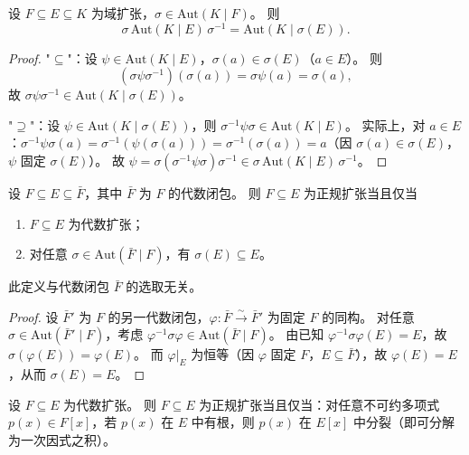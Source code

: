 \documentclass[lang=cn,a4paper,newtx]{elegantbook}
\begin{document}
\begin{proposition}
  设 $F\subseteq E\subseteq K$ 为域扩张，$\sigma\in\mathrm{Aut}(K\mid F)$。
  则
  \[
    \sigma\,\mathrm{Aut}(K\mid E)\,\sigma^{-1}=\mathrm{Aut}(K\mid\sigma(E)).
  \]
\end{proposition}

\begin{proof}
  "$\subseteq$"：设 $\psi\in\mathrm{Aut}(K\mid E)$，$\sigma(a)\in\sigma(E)$（$a\in E$）。
  则
  \[
    (\sigma\psi\sigma^{-1})(\sigma(a))=\sigma\psi(a)=\sigma(a),
  \]
  故 $\sigma\psi\sigma^{-1}\in\mathrm{Aut}(K\mid\sigma(E))$。

  "$\supseteq$"：设 $\psi\in\mathrm{Aut}(K\mid\sigma(E))$，则 $\sigma^{-1}\psi\sigma\in\mathrm{Aut}(K\mid E)$。
  实际上，对 $a\in E$：$\sigma^{-1}\psi\sigma(a)=\sigma^{-1}(\psi(\sigma(a)))=\sigma^{-1}(\sigma(a))=a$（因 $\sigma(a)\in\sigma(E)$，$\psi$ 固定 $\sigma(E)$）。
  故 $\psi=\sigma(\sigma^{-1}\psi\sigma)\sigma^{-1}\in\sigma\,\mathrm{Aut}(K\mid E)\,\sigma^{-1}$。
\end{proof}

\begin{proposition}
  设 $F\subseteq E\subseteq\bar F$，其中 $\bar F$ 为 $F$ 的代数闭包。
  则 $F\subseteq E$ 为正规扩张当且仅当
  \begin{enumerate}
    \item[(a)] $F\subseteq E$ 为代数扩张；
    \item[(b)] 对任意 $\sigma\in\mathrm{Aut}(\bar F\mid F)$，有 $\sigma(E)\subseteq E$。
  \end{enumerate}
  此定义与代数闭包 $\bar F$ 的选取无关。
\end{proposition}

\begin{proof}
  设 $\bar F'$ 为 $F$ 的另一代数闭包，$\varphi\colon\bar F\xrightarrow{\sim}\bar F'$ 为固定 $F$ 的同构。
  对任意 $\sigma\in\mathrm{Aut}(\bar F'\mid F)$，考虑 $\varphi^{-1}\sigma\varphi\in\mathrm{Aut}(\bar F\mid F)$。
  由已知 $\varphi^{-1}\sigma\varphi(E)=E$，故 $\sigma(\varphi(E))=\varphi(E)$。
  而 $\varphi\big|_E$ 为恒等（因 $\varphi$ 固定 $F$，$E\subseteq\bar F$），故 $\varphi(E)=E$，从而 $\sigma(E)=E$。
\end{proof}

\begin{lemma}
  设 $F\subseteq E$ 为代数扩张。
  则 $F\subseteq E$ 为正规扩张当且仅当：对任意不可约多项式 $p(x)\in F[x]$，若 $p(x)$ 在 $E$ 中有根，则 $p(x)$ 在 $E[x]$ 中分裂（即可分解为一次因式之积）。
\end{lemma}
\end{document}
